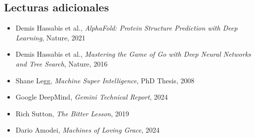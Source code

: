 \documentclass[a4paper]{article}
\begin{document}
\subsection{Lecturas adicionales}

\begin{itemize}
    \item Demis Hassabis et al., \textit{AlphaFold: Protein Structure Prediction with Deep Learning}, Nature, 2021
    \item Demis Hassabis et al., \textit{Mastering the Game of Go with Deep Neural Networks and Tree Search}, Nature, 2016
    \item Shane Legg, \textit{Machine Super Intelligence}, PhD Thesis, 2008
    \item Google DeepMind, \textit{Gemini Technical Report}, 2024
    \item Rich Sutton, \textit{The Bitter Lesson}, 2019
    \item Dario Amodei, \textit{Machines of Loving Grace}, 2024
\end{itemize}
\end{document}
